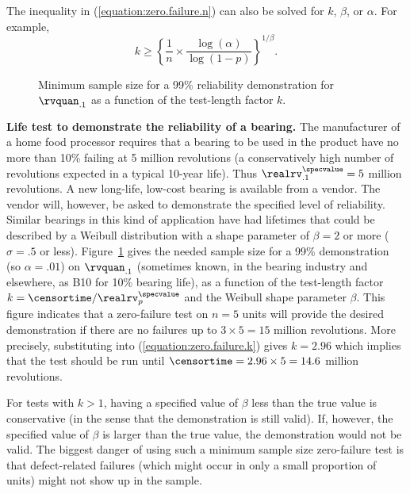 The inequality in
(\ref{equation:zero.failure.n}) can also be solved for $k$, $\beta$,
or $\alpha$.  For example,
\begin{equation}
\label{equation:zero.failure.k}
k \geq \left \{\frac{ 1 } {
n
       }
\times
\frac  { 
\log(\alpha) 
       } { \log(1-p) } \right\}^{1/\beta}.
\end{equation}

\begin{figure}
\caption{Minimum sample size for a 99\% reliability demonstration for
$\rvquan_{.1}$ as a function of the test-length factor $k$.}
\label{figure:zero.failure.ps}
\end{figure}

\begin{example}
{\bf Life test to demonstrate the reliability of a bearing.} The
manufacturer of a home food processor requires that a bearing to be
used in the product have no more than 10\% failing at 5 million
revolutions (a conservatively high number of revolutions expected in
a typical 10-year life).  Thus $\realrv_{.1}^{\specvalue}=5$ million
revolutions. A new long-life, low-cost bearing is available from a
vendor.  The vendor will, however, be asked to demonstrate the
specified level of reliability.  Similar bearings in this kind of
application have had lifetimes that could be described by a Weibull
distribution with a shape parameter of $\beta=2$ or more
($\sigma=.5$ or less).  Figure~\ref{figure:zero.failure.ps} gives
the needed sample size for a 99\% demonstration (so $\alpha=.01$) on
$\rvquan_{.1}$ (sometimes known, in the bearing industry and
elsewhere, as B10 for 10\% bearing life), as a function of the
test-length factor $k=\censortime/\realrv_{p}^{\specvalue}$ and the
Weibull shape parameter $\beta$. This figure indicates that a
zero-failure test on $n=5$ units will provide the desired
demonstration if there are no failures up to $3 \times 5 = 15 $
million revolutions.  More precisely, substituting into
(\ref{equation:zero.failure.k}) gives $k=2.96$ which implies that
the test should be run until $\censortime=2.96 \times 5 = 14.6$
million revolutions.
\end{example}

For tests with $k > 1$, having a specified value of $\beta$ less than
the true value is conservative (in the sense that the demonstration is
still valid).  If, however, the specified value of $\beta$ is larger
than the true value, the demonstration would not be valid.  The
biggest danger of using such a minimum sample size zero-failure test
is that defect-related failures (which might occur in only a small
proportion of units) might not show up in the sample.

